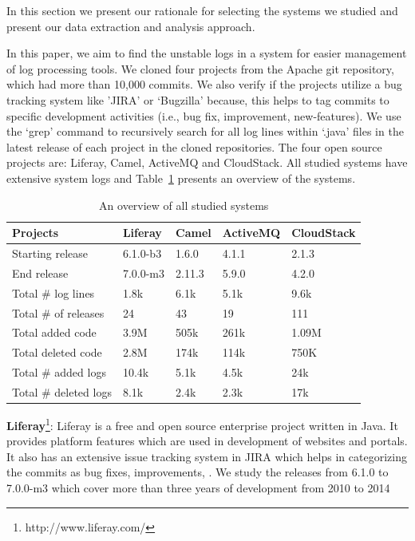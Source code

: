 In this section we present our rationale for selecting the systems we studied and present our data extraction and analysis approach.


In this paper, we aim to find the unstable logs in a system for easier management of log processing tools. We cloned four projects from the Apache git repository, which had more than 10,000 commits. We also verify if the projects utilize a bug tracking system like 'JIRA' or `Bugzilla' because, this helps to tag commits to specific development activities (i.e., bug fix, improvement, new-features). We use the `grep' command to recursively search for all log lines within `.java' files in the latest release of each project in the cloned repositories. The four open source projects are: Liferay, Camel, ActiveMQ and CloudStack. All studied systems have extensive system logs and Table~\ref{tba:overviewsystems} presents an overview of the systems.

\begin{table}[tbh]
\centering \protect\caption{An overview of all studied systems}


\label{tba:overviewsystems} %
\begin{tabular}{lllll}
\hline 
Projects  & Liferay  & Camel  & ActiveMQ  & CloudStack \tabularnewline
\hline 
Starting release  & 6.1.0-b3  & 1.6.0  & 4.1.1  & 2.1.3 \tabularnewline
End release  & 7.0.0-m3  & 2.11.3  & 5.9.0  & 4.2.0 \tabularnewline
Total \# log lines & 1.8k  & 6.1k & 5.1k  & 9.6k \tabularnewline
Total \# of releases   & 24  & 43  & 19 & 111 \tabularnewline
Total added code  & 3.9M  & 505k  & 261k  & 1.09M \tabularnewline
Total deleted code  & 2.8M  & 174k  & 114k  & 750K \tabularnewline
Total \# added logs  & 10.4k  & 5.1k  & 4.5k  & 24k \tabularnewline
Total \# deleted logs  & 8.1k  & 2.4k  & 2.3k  & 17k \tabularnewline
\hline 
\end{tabular}
\end{table}

\textbf{Liferay}\footnote[1]{http://www.liferay.com/}:  Liferay is a free and open source enterprise project written in Java. It provides platform features which are used in development of websites and portals.
  It also has an extensive issue tracking system in JIRA which helps in categorizing the commits as bug fixes, improvements, . We study the releases from 6.1.0 to 7.0.0-m3 which cover more than three years of development from 2010 to 2014

